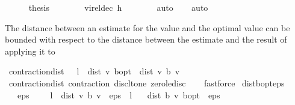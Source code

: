 \begin{isabellebody}
\isanewline
\ \ \ \ \isamarkupfalse%
\ {\isacharquery}{\kern0pt}thesis\isanewline
\ \ \ \ \ \ \isamarkupfalse%
\ vi{\isacharunderscore}{\kern0pt}rel{\isacharunderscore}{\kern0pt}dec\ h\isanewline
\ \ \ \ \ \ \isamarkupfalse%
\ auto\isanewline
\ \ \isamarkupfalse%
\isanewline
{}\isamarkupfalse%
\ auto%
\endisatagproof
{\isafoldproof}%
%
\isadelimproof
%
\endisadelimproof
%
\begin{isamarkuptext}%
The distance between an estimate for the value and the optimal value can be bounded with respect to 
the distance between the estimate and the result of applying it to %
\end{isamarkuptext}\isamarkuptrue%
\isamarkupfalse%
\ contraction{\isacharunderscore}{\kern0pt}{\isasymL}{\isacharunderscore}{\kern0pt}dist{\isacharcolon}{\kern0pt}\ {\isachardoublequoteopen}{\isacharparenleft}{\kern0pt}{}\ {\isacharminus}{\kern0pt}\ l{\isacharparenright}{\kern0pt}\ {\isacharasterisk}{\kern0pt}\ dist\ v\ {\isasymnu}\isactrlsub b{\isacharunderscore}{\kern0pt}opt\ {\isasymle}\ dist\ v\ {\isacharparenleft}{\kern0pt}{\isasymL}\isactrlsub b\ v{\isacharparenright}{\kern0pt}{\isachardoublequoteclose}\isanewline
%
\isadelimproof
\ \ %
\endisadelimproof
%
\isatagproof
{}\isamarkupfalse%
\ contraction{\isacharunderscore}{\kern0pt}dist\ contraction{\isacharunderscore}{\kern0pt}{\isasymL}\ disc{\isacharunderscore}{\kern0pt}lt{\isacharunderscore}{\kern0pt}one\ zero{\isacharunderscore}{\kern0pt}le{\isacharunderscore}{\kern0pt}disc\isanewline
\ \ \isamarkupfalse%
\ fastforce%
\endisatagproof
{\isafoldproof}%
%
\isadelimproof
\isanewline
%
\endisadelimproof
\isanewline
{}\isamarkupfalse%
\ dist{\isacharunderscore}{\kern0pt}{\isasymL}\isactrlsub b{\isacharunderscore}{\kern0pt}opt{\isacharunderscore}{\kern0pt}eps{\isacharcolon}{\kern0pt}\isanewline
\ \ \ {\isachardoublequoteopen}eps\ {\isachargreater}{\kern0pt}\ {}{\isachardoublequoteclose}\ {\isachardoublequoteopen}{}\ {\isacharasterisk}{\kern0pt}\ l\ {\isacharasterisk}{\kern0pt}\ dist\ v\ {\isacharparenleft}{\kern0pt}{\isasymL}\isactrlsub b\ v{\isacharparenright}{\kern0pt}\ {\isacharless}{\kern0pt}\ eps\ {\isacharasterisk}{\kern0pt}\ {\isacharparenleft}{\kern0pt}{}{\isacharminus}{\kern0pt}l{\isacharparenright}{\kern0pt}{\isachardoublequoteclose}\isanewline
\ \ \ {\isachardoublequoteopen}dist\ {\isacharparenleft}{\kern0pt}{\isasymL}\isactrlsub b\ v{\isacharparenright}{\kern0pt}\ {\isasymnu}\isactrlsub b{\isacharunderscore}{\kern0pt}opt\ {\isacharless}{\kern0pt}\ eps\ {\isacharslash}{\kern0pt}\ {}{\isachardoublequoteclose}\isanewline

\end{isabellebody}
